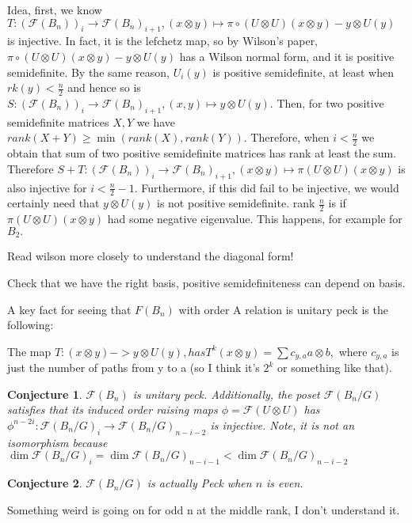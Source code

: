 \documentclass{amsart}
\newtheorem{conj}{Conjecture}
\begin{document}
Idea, first, we know $T:(\mathcal F(B_n))_i \rightarrow \mathcal F(B_n)_{i+1},(x\otimes y) \mapsto \pi \circ (U \otimes U)(x\otimes y) - y \otimes U(y)$ is injective. In fact, it is the lefchetz map, so by Wilson's paper, $\pi \circ (U \otimes U)(x\otimes y) - y \otimes U(y)$ has a Wilson normal form, and it is positive semidefinite. By the same reason, $U_i(y)$ is positive semidefinite, at least when $rk(y) < \frac{n}{2}$ and hence so is $S:(\mathcal F(B_n))_i \rightarrow \mathcal F(B_n)_{i+1},(x,y) \mapsto y \otimes U(y).$ Then, for two positive semidefinite matrices $X,Y$ we have $rank(X+Y) \geq \min (rank(X),rank(Y)).$ Therefore, when $i < \frac{n}{2}$ we obtain that  sum of two positive semidefinite matrices has rank at least the sum. Therefore $S+T:(\mathcal F(B_n))_i \rightarrow \mathcal F(B_n)_{i+1},(x \otimes y) \mapsto \pi(U\otimes U)(x \otimes y)$ is also injective for $i < \frac{n}{2}-1.$ Furthermore, if this did fail to be injective, we would certainly need that $y \otimes U(y)$ is not positive semidefinite. rank $\frac{n}{2}$ is if $ \pi(U\otimes U)(x \otimes y)$ had some negative eigenvalue. This happens, for example for $B_2.$

Read wilson more closely to understand the diagonal form!

Check that we have the right basis, positive semidefiniteness can depend on basis.

A key fact for seeing that $F(B_n)$ with order A relation is unitary peck is the following:

The map $T:(x\otimes y) -> y \otimes U(y), has T^k(x\otimes y) = \sum c_{y,a} a\otimes b,$ where $c_{y,a}$ is just the number of paths from y to a (so I think it's $2^k$ or something like that).

\begin{conj}
$\mathcal F(B_n)$ is unitary peck. Additionally, the poset $\mathcal F(B_n/G)$ satisfies that its induced order raising maps $\phi=\mathcal F(U\otimes U)$ has $\phi^{n-2i}:\mathcal F(B_n/G)_i \rightarrow \mathcal F(B_n/G)_{n-i-2}$ is injective. Note, it is not an isomorphism because $\dim\mathcal F(B_n/G)_i = \dim \mathcal F(B_n/G)_{n-i-1} <\dim\mathcal F(B_n/G)_{n-i-2}$
\end{conj}

\begin{conj}
$\mathcal F(B_n/G)$ is actually Peck when $n$ is even.
\end{conj}

Something weird is going on for odd n at the middle rank, I don't understand it.
\end{document}
